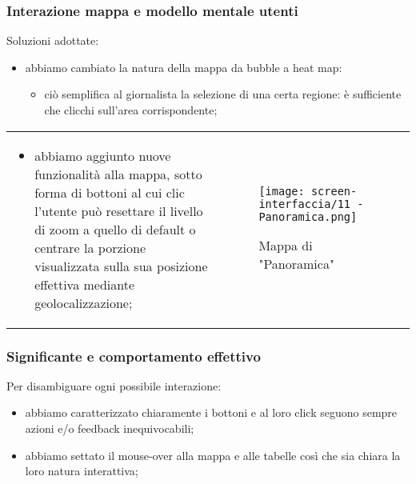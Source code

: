\begin{frame}
    \frametitle{Interazione mappa e modello mentale utenti}
    \label{f:mappa}
    Soluzioni adottate: 
    \begin{itemize}
        \item abbiamo cambiato la natura della mappa da bubble a heat map:
        \begin{itemize}
            \item ciò semplifica al giornalista la selezione di una certa regione: è sufficiente che clicchi sull'area corrispondente;
        \end{itemize}
    \end{itemize}
    \begin{tabular}{p{}p{}}    
        \begin{itemize}
            \item abbiamo aggiunto nuove funzionalità alla mappa, sotto forma di bottoni al cui clic l'utente può resettare il livello di zoom a quello di default o centrare la porzione visualizzata sulla sua posizione effettiva mediante geolocalizzazione; 
        \end{itemize} &
            
        \begin{figure}
            \centering
            \vspace{-20pt}
            \texttt{[image: screen-interfaccia/11 - Panoramica.png]}
            \caption{Mappa di "Panoramica"}
        \end{figure} \\

    \end{tabular}   

\end{frame}


\begin{frame}
    \frametitle{Significante e comportamento effettivo}
    \label{f:significante}
    Per disambiguare ogni possibile interazione:
    \begin{itemize}
        \item<1-> abbiamo caratterizzato chiaramente i bottoni e al loro click seguono sempre azioni e/o feedback inequivocabili;
        \item<2-> abbiamo settato il mouse-over alla mappa e alle tabelle così che sia chiara la loro natura interattiva;
    \end{itemize}
\end{frame}

